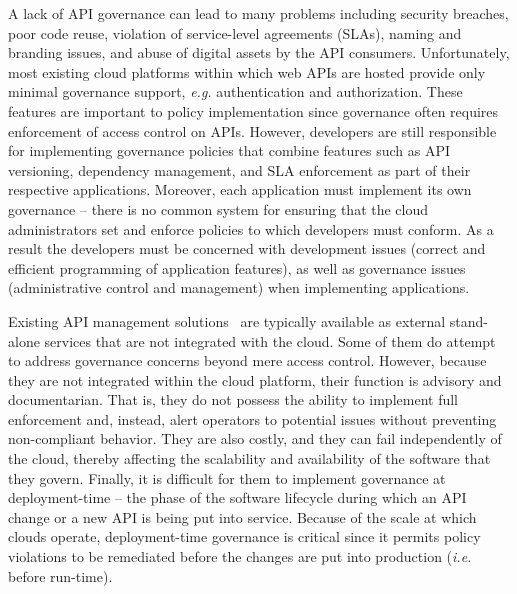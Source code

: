 A lack of API governance can lead to many problems including security breaches, 
poor code reuse, violation of service-level agreements (SLAs), 
naming and branding issues, and abuse of digital 
assets by the API consumers. Unfortunately, most existing cloud platforms
within which web APIs are hosted provide only minimal governance support, 
{\em e.g.} authentication and authorization.  These features
are important to policy implementation since governance often requires
enforcement of access control on APIs.  
However, developers are still responsible for implementing governance policies
that combine features such as API versioning, 
dependency management, and SLA enforcement as part of their respective
applications.  Moreover, each application must
implement its own governance -- there is no common system for ensuring that the
cloud administrators set and enforce policies to which developers must conform.
As a result the developers must be concerned with development issues (correct
and efficient programming of application features), as well as governance issues (administrative control and management) 
when implementing applications.

Existing API management solutions~\cite{3scale,apigee,layer7} are typically available as
external stand-alone services that are not integrated with the cloud. Some of them do attempt to
address governance concerns beyond mere access control. However, because they
are not integrated within the cloud platform, their function is
advisory and documentarian.  That is, they 
do not possess the ability to implement full enforcement and, instead, alert
operators to potential issues without preventing non-compliant behavior.
They are also costly, and they can fail independently of the cloud, thereby affecting 
the scalability and availability of the software that they govern.
Finally, it is difficult for them to
implement governance at deployment-time -- the phase of the software lifecycle
during which an API change or a new API is being put into service.
Because of the scale at which clouds operate, deployment-time governance is
critical since it permits policy violations to be remediated before the
changes are put into production ({\em i.e.} before run-time).

